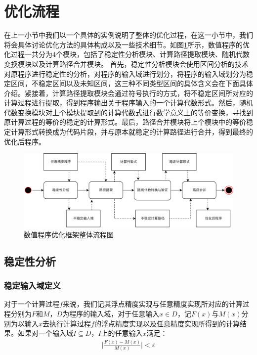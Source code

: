 \section{优化流程}
在上一小节中我们以一个具体的实例说明了整体的优化过程，在这一小节中，我们将会具体讨论优化方法的具体构成以及一些技术细节。如图\ref{fig:mainframe}所示，数值程序的优化过程一共分为4个模块，包括了稳定性分析模块、计算路径提取模块、随机代数变换模块以及计算路径合并模块。
首先，稳定性分析模块会使用区间分析的技术对原程序进行稳定性的分析，对程序的输入域进行划分，将程序的输入域划分为稳定区间，不稳定区间以及未知区间，这三种不同类型区间的具体含义会在下面具体介绍。紧接着，计算路径提取模块会通过符号执行的方式，将不稳定区间所对应的计算过程进行提取，得到程序输出关于程序输入的一个计算代数形式。然后，随机代数变换模块对上个模块提取到的计算代数式进行数学意义上的等价变换，寻找到原计算过程的等价的稳定的计算形式。最后，路径合并模块将上个模块中的等价稳定计算形式转换成为代码片段，并与原本就稳定的计算路径进行合并，得到最终的优化后程序。

\begin{figure}[thbp]
  \centering
 \includegraphics[width=\textwidth]{fig/MainFramework.pdf}
  \caption{数值程序优化框架整体流程图} \label{fig:mainframe}
\end{figure}

\subsection{稳定性分析}

\subsubsection{稳定输入域定义}
对于一个计算过程$f$来说，我们记其浮点精度实现与任意精度实现所对应的计算过程分别为$F$和$M$，$D$为程序的输入域，对于任意输入$x \in D$，记$F(x)$与$M(x)$分别为以输入$x$去执行计算过程$f$的浮点精度实现以及任意精度实现所得到的计算结果。如果对一个输入域$I \subseteq D$，$I$上的任意输入$x$满足：
\begin{align*}
  \Big|\frac{F(x)-M(x)}{M(x)}\Big| < \varepsilon
\end{align*}


